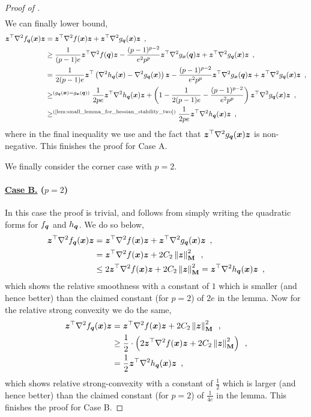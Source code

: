 \begin{proof}[Proof of ]
\begin{align*}
    \end{align*}
    We can finally lower bound,
    \begin{align*}
        \vz^{\top}\nabla^2f_{\vq}(\vx)\vz &= \vz^{\top}\nabla^2f(\vx)\vz + \vz^{\top}\nabla^2g_{\vq}(\vx)\vz\enspace,\\
        &\geq \frac{1}{(p-1)e}\vz^{\top}\nabla^2f(\vq)\vz - \frac{(p-1)^{p-2}}{e^2p^p}\vz^{\top}\nabla^2g_{\vx}(\vq)\vz + \vz^{\top}\nabla^2g_{\vq}(\vx)\vz\enspace,\\
        &= \frac{1}{2(p-1)e}\vz^{\top}\left(\nabla^2h_{\vq}(\vx)- \nabla^2g_{\vq}(\vx)\right)\vz - \frac{(p-1)^{p-2}}{e^2p^p}\vz^{\top}\nabla^2g_{\vx}(\vq)\vz + \vz^{\top}\nabla^2g_{\vq}(\vx)\vz\enspace,\\
        &\geq^{(g_{\vq}(\vx) = g_{\vx}(\vq))} \frac{1}{2pe}\vz^{\top}\nabla^2h_{\vq}(\vx)\vz + \left(1 - \frac{1}{2(p-1)e}- \frac{(p-1)^{p-2}}{e^2p^p}\right)\vz^{\top}\nabla^2g_{\vq}(\vx)\vz\enspace,\\
        &\geq^{\text{(\Cref{lem:small_lemma_for_hessian_stability_two})}}\frac{1}{2pe}\vz^{\top}\nabla^2h_{\vq}(\vx)\vz\enspace, 
    \end{align*}
    where in the final inequality we use  and the fact that $\bm{z}^{\top}\nabla^2g_{\bm{q}}(\bm{x})\bm{z}$ is non-negative. This finishes the proof for Case A.

    We finally consider the corner case with $p=2$. 

    \paragraph{\underline{Case B.} ($p=2$)} In this case the proof is trivial, and follows from simply writing the quadratic forms for $f_{\bm{q}}$ and $h_{\bm{q}}$. We do so below,
    \begin{align*}
        \bm{z}^{\top}\nabla^2f_{\bm{q}}(\bm{x})\bm{z} &= \bm{z}^{\top}\nabla^2f(\bm{x})\bm{z} + \bm{z}^{\top}\nabla^2g_{\bm{q}}(\bm{x})\bm{z}\enspace,\\
        &= \bm{z}^{\top}\nabla^2f(\bm{x})\bm{z} + 2C_2\left\lVert \bm{z} \right\rVert^2_{\mathbf{M}}\enspace,\\
        &\leq 2\bm{z}^{\top}\nabla^2f(\bm{x})\bm{z} + 2C_2\left\lVert \bm{z} \right\rVert^2_{\mathbf{M}} = \bm{z}^{\top}\nabla^2h_{\bm{q}}(\bm{x})\bm{z}\enspace,
    \end{align*}
    which shows the relative smoothness with a constant of $1$ which is smaller (and hence better) than the claimed constant (for $p=2$) of $2e$ in the lemma. Now for the relative strong convexity we do the same,
    \begin{align*}
        \bm{z}^{\top}\nabla^2f_{\bm{q}}(\bm{x})\bm{z} &= \bm{z}^{\top}\nabla^2f(\bm{x})\bm{z} + 2C_2\left\lVert \bm{z} \right\rVert^2_{\mathbf{M}}\enspace,\\
        &\geq \frac{1}{2}\cdot\left(2\bm{z}^{\top}\nabla^2f(\bm{x})\bm{z} + 2C_2\left\lVert \bm{z} \right\rVert^2_{\mathbf{M}}\right)\enspace,\\
        &= \frac{1}{2}\bm{z}^{\top}\nabla^2h_{\bm{q}}(\bm{x})\bm{z}\enspace,
    \end{align*}
    which shows relative strong-convexity with a constant of $\frac{1}{2}$ which is larger (and hence better) than the claimed constant (for $p=2$) of $\frac{1}{4e}$ in the lemma. This finishes the proof for Case B. 
    

\end{proof}
